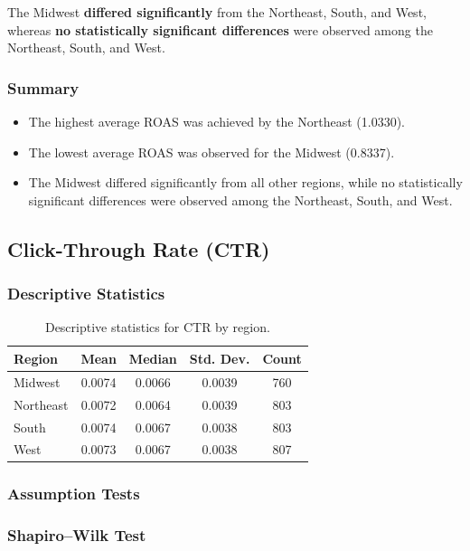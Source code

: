 The Midwest \textbf{differed significantly} from the Northeast, South, and West, whereas \textbf{no statistically significant differences} were observed among the Northeast, South, and West.

\subsubsection{Summary}

\begin{itemize}
	\item The highest average ROAS was achieved by the Northeast (1.0330).
	\item The lowest average ROAS was observed for the Midwest (0.8337).
	\item The Midwest differed significantly from all other regions, while no statistically significant differences were observed among the Northeast, South, and West.
\end{itemize}

\subsection{Click-Through Rate (CTR)}

\subsubsection{Descriptive Statistics} \label{appendix:regional_performance_analysis_CTR}

\begin{table}[H]
	\centering
	\caption{Descriptive statistics for CTR by region.}
	\begin{tabular}{lcccc}
		\toprule
		Region & Mean & Median & Std. Dev. & Count \\
		\midrule
		Midwest & 0.0074 & 0.0066 & 0.0039 & 760 \\
		Northeast & 0.0072 & 0.0064 & 0.0039 & 803 \\
		South & 0.0074 & 0.0067 & 0.0038 & 803 \\
		West & 0.0073 & 0.0067 & 0.0038 & 807 \\
		\bottomrule
	\end{tabular}
\end{table}

\subsubsection{Assumption Tests}

\subsubsection{Shapiro--Wilk Test}

